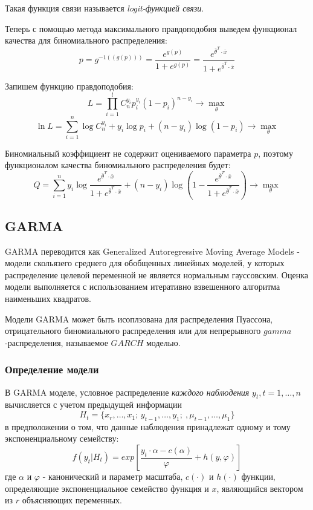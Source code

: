 \documentclass[aps,%
12pt,%
final,%
oneside,
onecolumn,%
musixtex, %
superscriptaddress,%
centertags]{article} %
\theoremstyle{plain}
\theoremstyle{definition}
\theoremstyle{remark}
\begin{document}
Такая функция связи называется \textit{logit-функцией связи}.

Теперь с помощью метода максимального правдоподобия выведем функционал качества для биномиального распределения:
$$p = g^{-1((g(p)))} = \frac{e^{g(p)}}{1+e^{g(p)}} = \frac{e^{\left .\bar{\theta}\right .^T \cdot \bar{x}}}{1+e^{\left .\bar{\theta}\right .^T \cdot \bar{x}}}$$

Запишем функцию правдоподобия:
$$L = \prod\limits_{i=1}^l C_n^{y_i} p_i^{y_i}(1-p_i)^{n-y_i} \to\underset{\theta}{\max}$$
$$\ln L = \sum\limits_{i=1}^n \log C_n^{y_i} + y_i \log p_i + (n-y_i)\log(1-p_i) \to\underset{\theta}{\max}$$

Биномиальный коэффициент не содержит оцениваемого параметра $p$, поэтому функционалом качества биномиального распределения будет:
$$Q = \sum\limits_{i=1}^n y_i \log \frac{e^{\left .\bar{\theta}\right .^T \cdot \bar{x}}}{1+e^{\left .\bar{\theta}\right .^T \cdot \bar{x}}} + (n-y_i)\log(1-\frac{e^{\left .\bar{\theta}\right .^T \cdot \bar{x}}}{1+e^{\left .\bar{\theta}\right .^T \cdot \bar{x}}}) \to\underset{\theta}{\max}$$

\newpage
\subsection{GARMA}

GARMA переводится как Generalized Autoregressive Moving Average Models - модели скольязего среднего для обобщенных линейных моделей, у которых распределение целевой переменной не является нормальным гауссовским. Оценка модели выполняется с использованием итеративно взвешенного алгоритма наименьших квадратов.

Модели GARMA может быть исоплзована для распределения Пуассона, отрицательного биномиального распределения или для непрерывного $gamma$-распределения, называемое $GARCH$ моделью.

\subsubsection{Определение модели}

В GARMA моделе, условное распределение \textit{каждого наблюдения} $y_t, t = 1,\ldots,n$ вычисляется с учетом предыдущей информации
$$H_t = \{x_r,\ldots,x_1; \, y_{t-1},\ldots,y_1;\ ,\mu_{t-1},\ldots,\mu_1\}$$
в предположении о том, что данные наблюдения принадлежат одному и тому экспоненциальному семейству:
$$f(y_t | H_t) = exp \left[\frac{y_t \cdot \alpha - c(\alpha)}{\varphi} + h(y,\varphi) \right]$$
где $\alpha$ и $\varphi$ - канонический и параметр масштаба, $c(\cdot)$ и $h(\cdot)$ функции, определяющие экспоненциальное семейство функция и $x$, являющийся вектором из $r$ объясняющих переменных.
\end{document}
